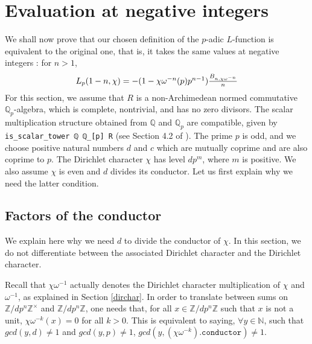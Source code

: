 \documentclass[a4paper,UKenglish,cleveref, autoref, thm-restate]{lipics-v2021}
\newcommand{\lean}[1]{\texttt{#1}\xspace} %
\begin{document}
\section{Evaluation at negative integers}
\label{section4}
We shall now prove that our chosen definition of the $p$-adic $L$-function is equivalent to the original one, that is, 
it takes the same values at negative integers : for $n > 1$,
\begin{equation}\label{eqn:1}
  $$ L_p (1 - n, \chi) = -(1 - \chi \omega^{-n}(p)p^{n - 1}) \frac{B_{n, \chi \omega^{-n}}}{n} $$
\end{equation}
For this section, we assume that $R$ is a non-Archimedean normed commutative $\mathbb{Q}_p$-algebra, 
which is complete, nontrivial, and has no zero divisors. The scalar multiplication structure obtained from $\mathbb{Q}$ 
and $\mathbb{Q}_p$ are compatible, given by \lean{is\_scalar\_tower ℚ ℚ\_[p] R} (see Section 4.2 of \cite{DD}). 
The prime $p$ is odd, and we choose positive natural numbers $d$ and $c$ which are mutually coprime and are also coprime to 
$p$. The Dirichlet character $\chi$ has level $d p^m$, where $m$ is positive. We also assume $\chi$ is even and $d$ divides 
its conductor. Let us first explain why we need the latter condition.

\subsection{Factors of the conductor}
We explain here why we need $d$ to divide the conductor of $\chi$. In this section, we do not differentiate between the associated Dirichlet 
character and the Dirichlet character. 

Recall that $\chi \omega^{-1}$ actually denotes the Dirichlet 
character multiplication of $\chi$ and $\omega^{-1}$, as explained in Section \ref{dirchar}. %
In order to translate between sums on $\mathbb{Z}/ d p^n \mathbb{Z} ^{\times}$ and $\mathbb{Z}/ d p^n \mathbb{Z}$, one needs that, for all $x \in \mathbb{Z}/ d p^n \mathbb{Z}$ 
such that $x$ is not a unit, $\chi \omega^{-k} (x) = 0$ for all $k > 0$. This is equivalent to saying, $\forall y \in \mathbb{N}$, such that 
$gcd (y, d) \ne 1$ and $gcd (y, p) \ne 1$, $gcd (y, (\chi \omega^{-k})\texttt{.conductor}) \ne 1$. 
\end{document}
